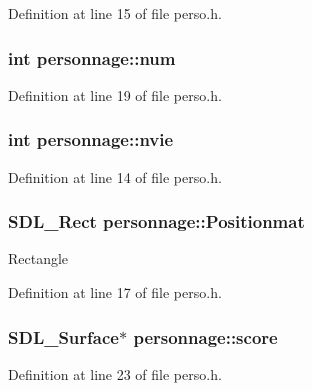Definition at line 15 of file perso.\+h.

\subsubsection[{\texorpdfstring{num}{num}}]{\setlength{\rightskip}{0pt plus 5cm}int personnage\+::num}\hypertarget{structpersonnage_acfac32928075716cc10265cfc9f551fc}{}\label{structpersonnage_acfac32928075716cc10265cfc9f551fc}


Definition at line 19 of file perso.\+h.

\subsubsection[{\texorpdfstring{nvie}{nvie}}]{\setlength{\rightskip}{0pt plus 5cm}int personnage\+::nvie}\hypertarget{structpersonnage_a5f78a81264a0d479a023826b20b86173}{}\label{structpersonnage_a5f78a81264a0d479a023826b20b86173}


Definition at line 14 of file perso.\+h.

\subsubsection[{\texorpdfstring{Positionmat}{Positionmat}}]{\setlength{\rightskip}{0pt plus 5cm}S\+D\+L\+\_\+\+Rect personnage\+::\+Positionmat}\hypertarget{structpersonnage_a8216e2ba9fa8840fd13e47f40ccf356d}{}\label{structpersonnage_a8216e2ba9fa8840fd13e47f40ccf356d}
Rectangle 

Definition at line 17 of file perso.\+h.

\subsubsection[{\texorpdfstring{score}{score}}]{\setlength{\rightskip}{0pt plus 5cm}S\+D\+L\+\_\+\+Surface$\ast$ personnage\+::score}\hypertarget{structpersonnage_ad1416e47a9921f214b01e8435d2ea476}{}\label{structpersonnage_ad1416e47a9921f214b01e8435d2ea476}


Definition at line 23 of file perso.\+h.

